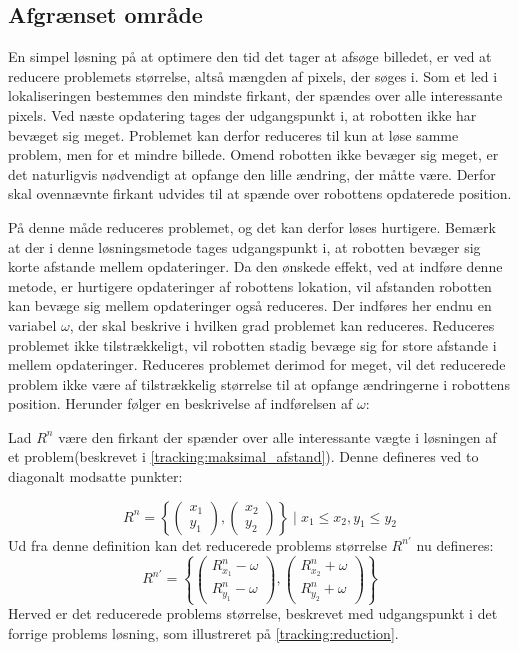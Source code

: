 \subsection{Afgrænset område}
En simpel løsning på at optimere den tid det tager at afsøge billedet, er ved at reducere problemets størrelse, altså mængden af pixels, der søges i.
Som et led i lokaliseringen bestemmes den mindste firkant, der spændes over alle interessante pixels.
Ved næste opdatering tages der udgangspunkt i, at robotten ikke har bevæget sig meget.
Problemet kan derfor reduceres til kun at løse samme problem, men for et mindre billede.
Omend robotten ikke bevæger sig meget, er det naturligvis nødvendigt at opfange den lille ændring, der måtte være.
Derfor skal ovennævnte firkant udvides til at spænde over robottens opdaterede position.

På denne måde reduceres problemet, og det kan derfor løses hurtigere.
Bemærk at der i denne løsningsmetode tages udgangspunkt i, at robotten bevæger sig korte afstande mellem opdateringer.
Da den ønskede effekt, ved at indføre denne metode, er hurtigere opdateringer af robottens lokation, vil afstanden robotten kan bevæge sig mellem opdateringer også reduceres.
Der indføres her endnu en variabel $\omega$, der skal beskrive i hvilken grad problemet kan reduceres.
Reduceres problemet ikke tilstrækkeligt, vil robotten stadig bevæge sig for store afstande i mellem opdateringer.
Reduceres problemet derimod for meget, vil det reducerede problem ikke være af tilstrækkelig størrelse til at opfange ændringerne i robottens position.
Herunder følger en beskrivelse af indførelsen af $\omega$:

Lad $R^n$ være den firkant der spænder over alle interessante vægte i løsningen af et problem(beskrevet i \cref{tracking:maksimal_afstand}).
Denne defineres ved to diagonalt modsatte punkter:
{
\newcommand{\cvec}[2]{\begin{pmatrix}#1\\#2\end{pmatrix}}

$$R^n = \left\{\cvec{x_1}{y_1}, \cvec{x_2}{y_2}\right\} \mid x_1 \leq x_2 , y_1 \leq y_2$$
Ud fra denne definition kan det reducerede problems størrelse $R^{n'}$ nu defineres:
\begin{equation}\label{tracking:eq:inflate}
R^{n'} = \left\{
	\cvec{R^n_{x_1}-\omega}{R^n_{y_1}-\omega},
	\cvec{R^n_{x_2}+\omega}{R^n_{y_2}+\omega}
\right\}
\end{equation}
Herved er det reducerede problems størrelse, beskrevet med udgangspunkt i det forrige problems løsning, som illustreret på \cref{tracking:reduction}.
}

